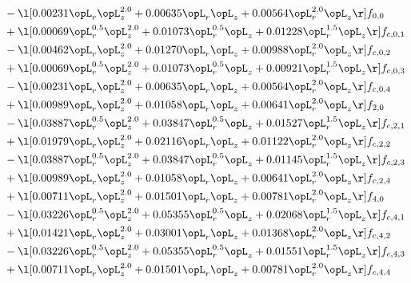 \begin{alignat}{2}
& - \l[  0.00231 \opL_r \opL_z^{2.0} +  0.00635 \opL_r \opL_z +  0.00564 \opL_r^{2.0} \opL_z  \r] f_{0,0} \nonumber \\ 
& + \l[  0.00069 \opL_r^{0.5} \opL_z^{2.0} +  0.01073 \opL_r^{0.5} \opL_z +  0.01228 \opL_r^{1.5} \opL_z  \r] f_{c,0,1} \nonumber \\ 
& - \l[  0.00462 \opL_r \opL_z^{2.0} +  0.01270 \opL_r \opL_z +  0.00988 \opL_r^{2.0} \opL_z  \r] f_{c,0,2} \nonumber \\ 
& + \l[  0.00069 \opL_r^{0.5} \opL_z^{2.0} +  0.01073 \opL_r^{0.5} \opL_z +  0.00921 \opL_r^{1.5} \opL_z  \r] f_{c,0,3} \nonumber \\ 
& - \l[  0.00231 \opL_r \opL_z^{2.0} +  0.00635 \opL_r \opL_z +  0.00564 \opL_r^{2.0} \opL_z  \r] f_{c,0,4} \nonumber \\ 
& + \l[  0.00989 \opL_r \opL_z^{2.0} +  0.01058 \opL_r \opL_z +  0.00641 \opL_r^{2.0} \opL_z  \r] f_{2,0} \nonumber \\ 
& - \l[  0.03887 \opL_r^{0.5} \opL_z^{2.0} +  0.03847 \opL_r^{0.5} \opL_z +  0.01527 \opL_r^{1.5} \opL_z  \r] f_{c,2,1} \nonumber \\ 
& + \l[  0.01979 \opL_r \opL_z^{2.0} +  0.02116 \opL_r \opL_z +  0.01122 \opL_r^{2.0} \opL_z  \r] f_{c,2,2} \nonumber \\ 
& - \l[  0.03887 \opL_r^{0.5} \opL_z^{2.0} +  0.03847 \opL_r^{0.5} \opL_z +  0.01145 \opL_r^{1.5} \opL_z  \r] f_{c,2,3} \nonumber \\ 
& + \l[  0.00989 \opL_r \opL_z^{2.0} +  0.01058 \opL_r \opL_z +  0.00641 \opL_r^{2.0} \opL_z  \r] f_{c,2,4} \nonumber \\ 
& + \l[  0.00711 \opL_r \opL_z^{2.0} +  0.01501 \opL_r \opL_z +  0.00781 \opL_r^{2.0} \opL_z  \r] f_{4,0} \nonumber \\ 
& - \l[  0.03226 \opL_r^{0.5} \opL_z^{2.0} +  0.05355 \opL_r^{0.5} \opL_z +  0.02068 \opL_r^{1.5} \opL_z  \r] f_{c,4,1} \nonumber \\ 
& + \l[  0.01421 \opL_r \opL_z^{2.0} +  0.03001 \opL_r \opL_z +  0.01368 \opL_r^{2.0} \opL_z  \r] f_{c,4,2} \nonumber \\ 
& - \l[  0.03226 \opL_r^{0.5} \opL_z^{2.0} +  0.05355 \opL_r^{0.5} \opL_z +  0.01551 \opL_r^{1.5} \opL_z  \r] f_{c,4,3} \nonumber \\ 
& + \l[  0.00711 \opL_r \opL_z^{2.0} +  0.01501 \opL_r \opL_z +  0.00781 \opL_r^{2.0} \opL_z  \r] f_{c,4,4} \nonumber \\ 
\end{alignat} 


